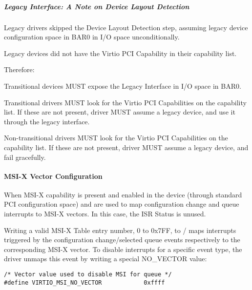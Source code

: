 \subparagraph{Legacy Interface: A Note on Device Layout Detection}\label{sec:Virtio Transport Options / Virtio Over PCI Bus / PCI-specific Initialization And Device Operation / Device Initialization / Virtio Device Configuration Layout Detection / Legacy Interface: A Note on Device Layout Detection}

Legacy drivers skipped the Device Layout Detection step, assuming legacy
device configuration space in BAR0 in I/O space unconditionally.

Legacy devices did not have the Virtio PCI Capability in their
capability list.

Therefore:

Transitional devices MUST expose the Legacy Interface in I/O
space in BAR0.

Transitional drivers MUST look for the Virtio PCI
Capabilities on the capability list.
If these are not present, driver MUST assume a legacy device,
and use it through the legacy interface.

Non-transitional drivers MUST look for the Virtio PCI
Capabilities on the capability list.
If these are not present, driver MUST assume a legacy device,
and fail gracefully.

\paragraph{MSI-X Vector Configuration}\label{sec:Virtio Transport Options / Virtio Over PCI Bus / PCI-specific Initialization And Device Operation / Device Initialization / MSI-X Vector Configuration}

When MSI-X capability is present and enabled in the device
(through standard PCI configuration space)  and  are used to map configuration change and queue
interrupts to MSI-X vectors. In this case, the ISR Status is unused.

Writing a valid MSI-X Table entry number, 0 to 0x7FF, to
/ maps interrupts triggered
by the configuration change/selected queue events respectively to
the corresponding MSI-X vector. To disable interrupts for a
specific event type, the driver unmaps this event by writing a special NO_VECTOR
value:

\begin{lstlisting}
/* Vector value used to disable MSI for queue */
#define VIRTIO_MSI_NO_VECTOR            0xffff
\end{lstlisting}

